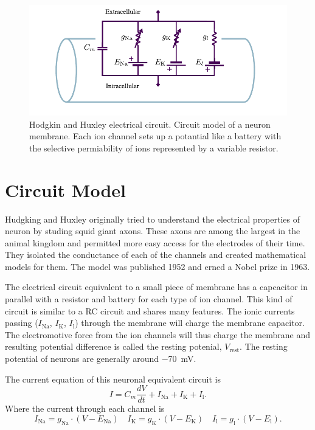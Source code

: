 \documentclass[altfont, fleqn]{uiophd}
\begin{document}
\begin{figure}[h]
    \centering
    \includegraphics[width=1.0\textwidth]{images/2_1/compartment.pdf}
    \caption{Hodgkin and Huxley electrical circuit. 
    Circuit model of a neuron membrane. 
    Each ion channel sets up a potantial like a battery with the 
    selective permiability of ions represented by a variable resistor. 
    }
    \label{fig:2_hud_hux}
\end{figure}

\section{Circuit Model}
Hudgking and Huxley originally tried to understand the
electrical properties of neuron by studing squid giant axons. 
These axons are among the largest in the animal kingdom
and permitted more easy access for the electrodes of their time. 
They isolated the conductance of each of the channels
and created mathematical models for them. 
The model was published 1952 and erned 
a Nobel prize in 1963. 

The electrical circuit equivalent to a small piece of membrane 
has a capcacitor in parallel with a resistor and battery 
for each type of ion channel. 
This kind of circuit is similar to a RC circuit and
shares many features. 
The ionic currents passing 
($I_\text{Na}$, 
$I_\text{K}$, 
$I_\text{l}$) 
through the membrane will charge the membrane capacitor. 
The electromotive force from the ion channels will thus
charge the membrane and resulting potential difference 
is called the resting potenial, $V_\text{rest}$. 
The resting potential of neurons are generally around
\SI{-70}{\milli\volt}. 

The current equation of this neuronal equivalent circuit is
\begin{equation} \label{eq:hux_current_eq}
I = C_m \frac{dV}{dt} + I_\text{Na} + I_\text{K} + I_\text{l}.
\end{equation}
Where the current through each channel is 
\begin{equation} 
    I_\text{Na} = g_\text{Na} \cdot (V - E_\text{Na}) \quad
    I_\text{K} = g_\text{K}  \cdot (V - E_\text{K}) \quad
    I_\text{l} = g_\text{l}  \cdot (V - E_\text{l}).
\end{equation}
\end{document}
